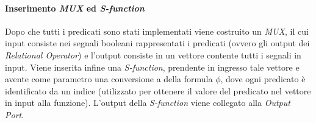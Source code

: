 \documentclass[10pt,a4paper]{article}
\newcommand{\SFunction}{\emph{S-function}}
\newcommand{\Oport}{\emph{Output Port}}
\newcommand{\RelOp}{\emph{Relational Operator}}
\newcommand{\MUX}{\emph{MUX}}
\begin{document}
	\paragraph{Inserimento \MUX{} ed \SFunction{}}
	Dopo che tutti i predicati sono stati implementati viene costruito un \MUX, il cui input consiste nei segnali booleani rappresentati i predicati (ovvero gli output dei \RelOp) e l'output consiste in un vettore contente tutti i segnali in input. Viene inserita infine una \SFunction{}, prendente in ingresso tale vettore e avente come parametro una conversione a \BLTLstar{} della formula $\phi$, dove ogni predicato  è identificato da un indice (utilizzato per ottenere il valore del predicato nel vettore in input alla funzione). L'output della \SFunction{} viene collegato alla \Oport.
\end{document}
